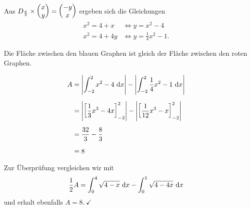 \documentclass[main.tex]{subfiles}
\begin{document}
Aus $D_{\frac{\pi}{2}} \times \vektor{x \\ y} = \vektor{-y \\ x}$ ergeben sich die Gleichungen
\begin{align*}
    x^2 = 4+x    &\Leftrightarrow y = x^2 -4 \\
    x^2 = 4 + 4y &\Leftrightarrow y = \frac{1}{4} x^2 -1.
\end{align*}

Die Fläche zwischen den blauen Graphen ist gleich der Fläche zwischen den roten Graphen. 

\begin{align*}
    A &= \left| \int_{-2}^{2} x^2-4 ~\mathrm{d}x \right| - \left| \int_{-2}^{2} \frac{1}{4} x^2 -1 ~\mathrm{d}x \right| \\[2mm]
      &= \left| \left[ \frac{1}{3} x^3 - 4x \right]_{-2}^{2}\right| - \left| \left[ \frac{1}{12} x^3 - x \right]_{-2}^{2}\right| \\[2mm]
      &= \frac{32}{3} - \frac{8}{3} \\[2mm]
      &= 8
\end{align*}

Zur Überprüfung vergleichen wir mit
\begin{align*}
    \frac{1}{2} A = \int_{0}^{4} \sqrt{4-x} ~\mathrm{d}x - \int_{0}^{1} \sqrt{4-4x} ~\mathrm{d}x
\end{align*}
und erhalt ebenfalls $A=8.\ \checkmark$
\end{document}
